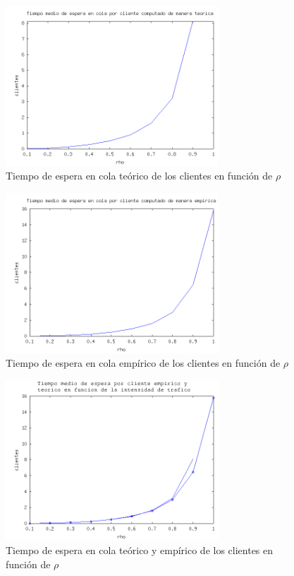 \documentclass{sig-alternate}
\begin{document}
\begin{figure}[ht]
\begin{center}
\includegraphics[width=8cm]{queueWaitTheoretical}
\caption{\label{fig:teowq} Tiempo de espera en cola te\'orico de los clientes en funci\'on de $\rho$}
\end{center}
\end{figure}
\begin{figure}[ht]
\begin{center}
\includegraphics[width=8cm]{queueWaitEmpirical}
\caption{\label{fig:empwq} Tiempo de espera en cola empírico de los clientes en funci\'on de $\rho$}
\end{center}
\end{figure}
\begin{figure}[ht]
\begin{center}
\includegraphics[width=8cm]{queueWaitCompare}
\caption{\label{fig:teovsempwq} Tiempo de espera en cola te\'orico y empírico de los clientes en funci\'on de $\rho$}
\end{center}
\end{figure}
\end{document}
